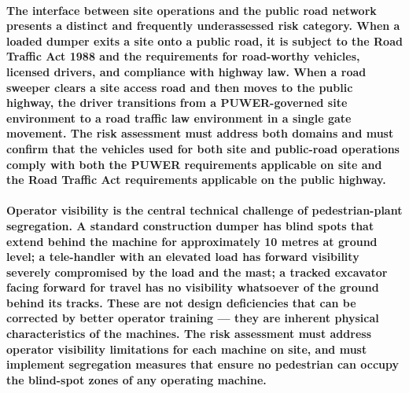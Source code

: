 \paragraph{The interface between site operations and the public road network presents a distinct and frequently underassessed risk category. When a loaded dumper exits a site onto a public road, it is subject to the Road Traffic Act 1988 and the requirements for road-worthy vehicles, licensed drivers, and compliance with highway law. When a road sweeper clears a site access road and then moves to the public highway, the driver transitions from a PUWER-governed site environment to a road traffic law environment in a single gate movement. The risk assessment must address both domains and must confirm that the vehicles used for both site and public-road operations comply with both the PUWER requirements applicable on site and the Road Traffic Act requirements applicable on the public highway.}

\paragraph{Operator visibility is the central technical challenge of pedestrian-plant segregation. A standard construction dumper has blind spots that extend behind the machine for approximately 10 metres at ground level; a tele-handler with an elevated load has forward visibility severely compromised by the load and the mast; a tracked excavator facing forward for travel has no visibility whatsoever of the ground behind its tracks. These are not design deficiencies that can be corrected by better operator training --- they are inherent physical characteristics of the machines. The risk assessment must address operator visibility limitations for each machine on site, and must implement segregation measures that ensure no pedestrian can occupy the blind-spot zones of any operating machine.}


